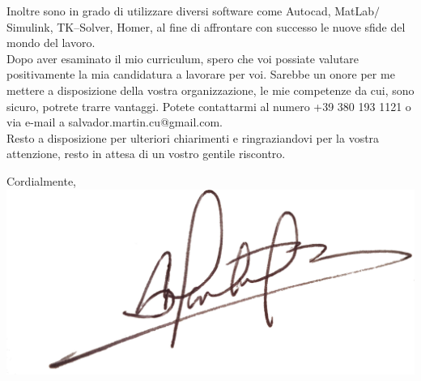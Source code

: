 \documentclass[11pt,a4paper,roman]{moderncv}
\begin{document}
	Inoltre sono in grado di utilizzare diversi software come Autocad, MatLab$/$Simulink, TK--Solver, Homer, al fine di affrontare con successo le nuove sfide del mondo del lavoro.\\
	Dopo aver esaminato il mio curriculum, spero che voi possiate valutare positivamente la mia candidatura a lavorare per voi. Sarebbe un onore per me mettere a disposizione della vostra organizzazione, le mie competenze da cui, sono sicuro, potrete trarre vantaggi. Potete contattarmi al numero +39 380 193 1121 o via e-mail a salvador.martin.cu@gmail.com.\\
	Resto a disposizione per ulteriori chiarimenti e ringraziandovi per la vostra attenzione, resto in attesa di un vostro gentile riscontro.\\
	\begin{minipage}[t]{0.3\textwidth}
		Cordialmente, \includegraphics[width=\textwidth]{firma}
	\end{minipage}
\end{document}
